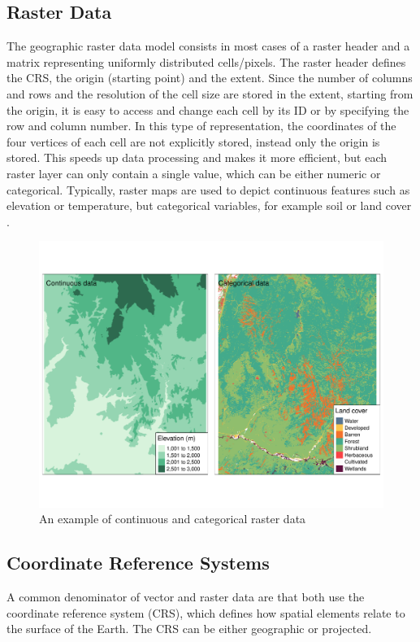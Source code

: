 \subsection{Raster Data}
The geographic raster data model consists in most cases of a raster header and a matrix representing uniformly distributed cells/pixels. The raster header defines the CRS, the origin (starting point) and the extent. Since the number of columns and rows and the resolution of the cell size are stored in the extent, starting from the origin, it is easy to access and change each cell by its ID or by specifying the row and column number. In this type of representation, the coordinates of the four vertices of each cell are not explicitly stored, instead only the origin is stored. This speeds up data processing and makes it more efficient, but each raster layer can only contain a single value, which can be either numeric or categorical. Typically, raster maps are used to depict continuous features such as elevation or temperature, but categorical variables, for example soil or land cover \autocite[][]{lovelace2019geocomputation}.
\begin{figure}[H]
   \centering
       \includegraphics[page=1,width=\textwidth]{raster.pdf}
 \caption{An example of continuous and categorical raster data}
 \label{fig:raster}
\end{figure}
\subsection*{Coordinate Reference Systems}
A common denominator of vector and raster data are that both use the coordinate reference system (CRS), which defines how spatial elements relate to the surface of the Earth. The CRS can be either geographic or projected.
